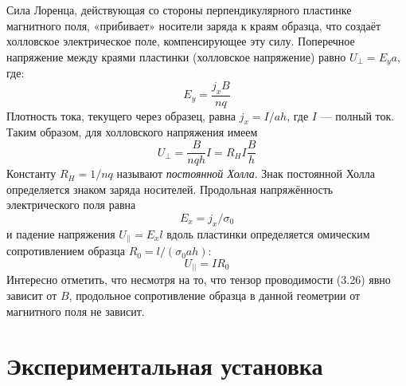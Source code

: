 \documentclass[15pt,a5paper,reqno]{article}
\begin{document}
    Сила Лоренца, действующая со стороны перпендикулярного пластинке магнитного поля, «прибивает» носители заряда к краям образца, что создаёт холловское электрическое поле, компенсирующее эту силу. Поперечное напряжение между краями пластинки (холловское напряжение) равно $U_{\perp} = E_ya$, где:
    \begin{equation*}
        E_y = \frac{j_x B}{nq}
    \end{equation*}
    Плотность тока, текущего через образец, равна $j_x = I/ah$, где $I$ — полный ток. Таким образом, для холловского напряжения имеем
    \begin{equation}\label{holes_voltage}
        \boxed{U_{\perp} = \frac{B}{nqh}I = R_H I \frac{B}{h}}
    \end{equation}
    Константу $R_H = 1/nq$ называют \textit{постоянной Холла}. Знак постоянной Холла определяется знаком заряда носителей. Продольная напряжённость электрического поля равна
    \begin{equation*}
        E_x = j_x / \sigma_0
    \end{equation*}
    и падение напряжения $U_{||} = E_x l$ вдоль пластинки определяется омическим сопротивлением образца $R_0 = l / (\sigma_0 a h)$:
    \begin{equation*}
        U_{||} = IR_0
    \end{equation*}
    Интересно отметить, что несмотря на то, что тензор проводимости (3.26) явно зависит от $B$, продольное сопротивление образца в данной геометрии от магнитного поля не зависит.

\section{Экспериментальная установка}
\end{document}
